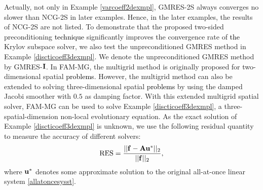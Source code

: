 \documentclass[11pt]{article}%
\numberwithin{equation}{section}
\begin{document}
Actually, not only in Example \ref{varcoeff2dexmpl}, GMRES-2S always converges no slower than NCG-2S in later examples. Hence, in the later examples, the results of NCG-2S are not listed. To demonstrate that the proposed two-sided preconditioning \textcolor{black}{technique} significantly improves the convergence rate of \textcolor{black}{the} Krylov subspace solver, we also test the unpreconditioned GMRES method in Example \ref{discticoeff3dexmpl}. We denote the unpreconditioned GMRES method by GMRES-${\bf I}$. 
In FAM-MG, the multigrid method is originally proposed for two-dimensional spatial \textcolor{black}{problems}. However, the multigrid method can also be extended to solving three-dimensional spatial \textcolor{black}{problems} by using the damped Jacobi smoother with $0.5$ as damping factor. With this extended multigrid spatial solver, FAM-MG can be used to solve  Example \ref{discticoeff3dexmpl}, a three-spatial-dimension non-local evolutionary equation.
As the exact solution of Example \ref{discticoeff3dexmpl} is unknown, we use the following residual quantity to measure the accuracy of different solvers:
\begin{equation*}
{\rm RES}=\frac{||{\bf f}-{\bf A}{\bf u}^{*}||_2}{||{\bf f}||_2},
\end{equation*}
where ${\bf u}^{*}$ denotes some approximate solution to the original all-at-once linear system \eqref{allatoncesysst}. 
\end{document}
